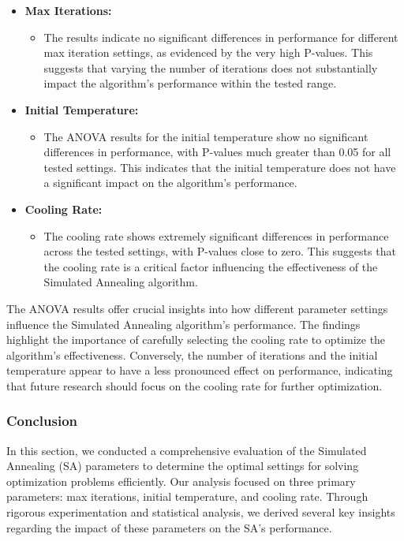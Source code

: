 \documentclass{article}
\begin{document}
    \begin{itemize}
        \item \textbf{Max Iterations:}
        \begin{itemize}
            \item The results indicate no significant differences in performance for different max iteration settings, as evidenced by the very high P-values. This suggests that varying the number of iterations does not substantially impact the algorithm's performance within the tested range.
        \end{itemize}
        \item \textbf{Initial Temperature:}
        \begin{itemize}
            \item The ANOVA results for the initial temperature show no significant differences in performance, with P-values much greater than 0.05 for all tested settings. This indicates that the initial temperature does not have a significant impact on the algorithm's performance.
        \end{itemize}
        \item \textbf{Cooling Rate:}
        \begin{itemize}
            \item The cooling rate shows extremely significant differences in performance across the tested settings, with P-values close to zero. This suggests that the cooling rate is a critical factor influencing the effectiveness of the Simulated Annealing algorithm.
        \end{itemize}
    \end{itemize}

    The ANOVA results offer crucial insights into how different parameter settings influence the Simulated Annealing algorithm's performance. The findings highlight the importance of carefully selecting the cooling rate to optimize the algorithm's effectiveness. Conversely, the number of iterations and the initial temperature appear to have a less pronounced effect on performance, indicating that future research should focus on the cooling rate for further optimization.

    \subsubsection{Conclusion}

    In this section, we conducted a comprehensive evaluation of the Simulated Annealing (SA) parameters to determine the optimal settings for solving optimization problems efficiently. Our analysis focused on three primary parameters: max iterations, initial temperature, and cooling rate. Through rigorous experimentation and statistical analysis, we derived several key insights regarding the impact of these parameters on the SA's performance.
\end{document}
